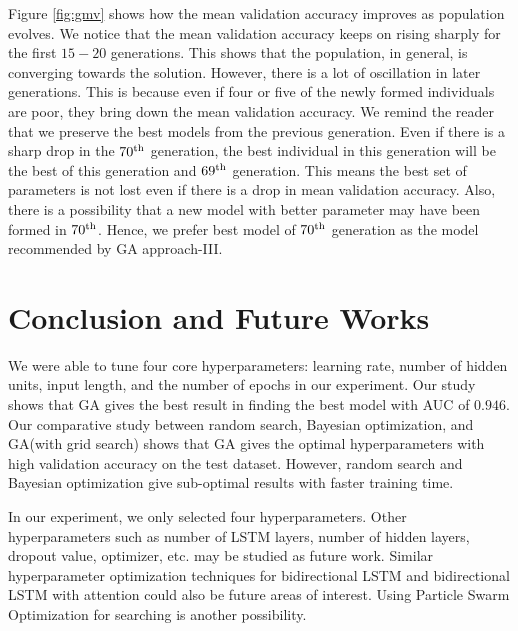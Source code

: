 \documentclass[conference]{IEEEtran}
\begin{document}
Figure \ref{fig:gmv} shows how the mean validation accuracy improves  as population evolves. We notice that the mean validation accuracy keeps on rising sharply for the first $15-20$ generations. This shows that the population, in general, is converging towards the solution. However, there is a lot of oscillation in later generations. This is because even if four or five of the newly formed individuals are poor, they bring down the mean validation accuracy. We remind the reader that we preserve the best models from the previous generation. Even if there is a sharp drop in the $70\textsuperscript{th}$ generation, the best individual in this generation will be the best of this generation and $69\textsuperscript{th}$ generation. This means the best set of parameters is not lost even if there is a drop in mean validation accuracy. Also, there is a possibility that a new model with better parameter may have been formed in $70\textsuperscript{th}$. Hence, we prefer best model of $70\textsuperscript{th}$ generation as the model recommended by GA approach-III.

\section{Conclusion and Future Works}
We were able to tune four core hyperparameters: learning rate, number of hidden units, input length, and the number of epochs in our experiment. Our study shows that GA gives the best result in finding the best model with AUC of $0.946$. Our comparative study between random search, Bayesian optimization, and GA(with grid search) shows that GA gives the optimal hyperparameters with high validation accuracy on the test dataset. However, random search and Bayesian optimization give sub-optimal results with faster training time.

In our experiment, we only selected four hyperparameters. Other hyperparameters such as number of LSTM layers, number of hidden layers, dropout value, optimizer, etc. may be studied as future work. Similar hyperparameter optimization techniques for bidirectional LSTM and bidirectional LSTM with attention could also be future areas of interest. Using Particle Swarm Optimization for searching is another possibility.
\end{document}
